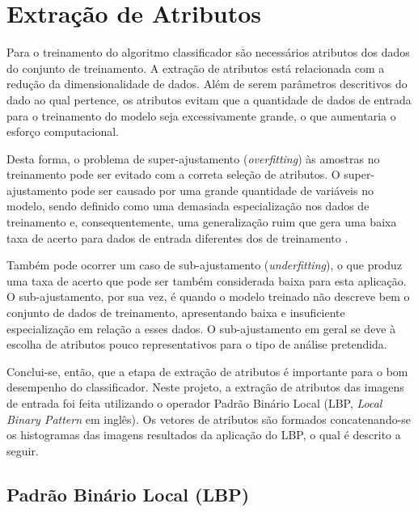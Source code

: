 
\section{Extração de Atributos}

Para o treinamento do algoritmo classificador são necessários atributos dos dados do conjunto de treinamento. A extração de atributos está relacionada com a redução da dimensionalidade de dados. Além de serem parâmetros descritivos do dado ao qual pertence, os atributos evitam que a quantidade de dados de entrada para o treinamento do modelo seja excessivamente grande, o que aumentaria o esforço computacional.

Desta forma, o problema de super-ajustamento (\textit{overfitting}) às amostras no treinamento pode ser evitado com a correta seleção de atributos.  O super-ajustamento pode ser causado por uma grande quantidade de variáveis no modelo, sendo definido como uma demasiada especialização nos dados de treinamento e, consequentemente, uma generalização ruim que gera uma baixa taxa de acerto para dados de entrada diferentes dos de treinamento .

Também pode ocorrer um caso de sub-ajustamento (\textit{underfitting}), o que produz uma taxa de acerto que pode ser também considerada baixa para esta aplicação. O sub-ajustamento, por sua vez, é quando o modelo treinado não descreve bem o conjunto de dados de treinamento, apresentando baixa e insuficiente especialização em relação a esses dados. O sub-ajustamento em geral se deve à escolha de atributos pouco representativos para o tipo de análise pretendida.

Conclui-se, então, que a etapa de extração de atributos é importante para o bom desempenho do classificador. Neste projeto, a extração de atributos das imagens de entrada foi feita utilizando o operador Padrão Binário Local (LBP, \textit{Local Binary Pattern} em inglês). Os vetores de atributos são formados concatenando-se os histogramas das imagens resultados da aplicação do LBP, o qual é descrito a seguir.


\subsection{Padrão Binário Local (LBP)}

